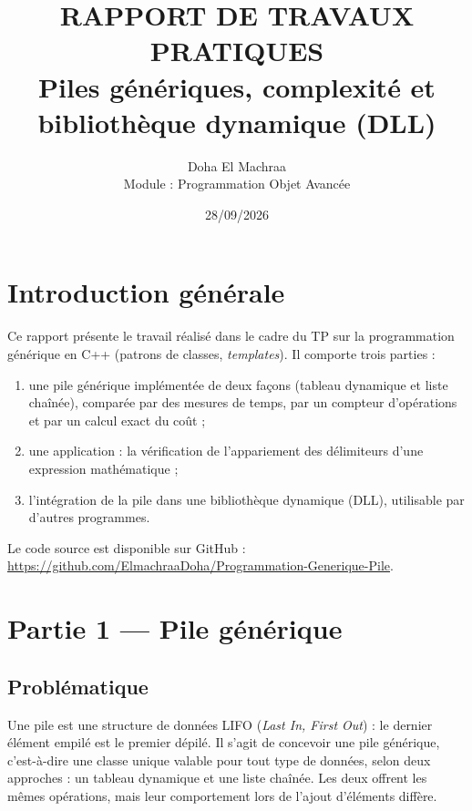 \documentclass[11pt,a4paper]{article}
\title{
\textbf{RAPPORT DE TRAVAUX PRATIQUES}\\[4pt]
\large Piles génériques, complexité et bibliothèque dynamique (DLL)
}
\author{Doha El Machraa\\ Module : Programmation Objet Avancée}
\date{28/09/2026}
\begin{document}
\maketitle
\tableofcontents
\bigskip

\section{Introduction générale}

Ce rapport présente le travail réalisé dans le cadre du TP sur la programmation générique en C++ (patrons de classes, \emph{templates}). Il comporte trois parties :
\begin{enumerate}[nosep]
    \item une pile générique implémentée de deux façons (tableau dynamique et liste chaînée), comparée par des mesures de temps, par un compteur d'opérations et par un calcul exact du coût ;
    \item une application : la vérification de l'appariement des délimiteurs d'une expression mathématique ;
    \item l'intégration de la pile dans une bibliothèque dynamique (DLL), utilisable par d'autres programmes.
\end{enumerate}

Le code source est disponible sur GitHub : \url{https://github.com/ElmachraaDoha/Programmation-Generique-Pile}.

\section{Partie 1 --- Pile générique}

\subsection{Problématique}

Une pile est une structure de données LIFO (\emph{Last In, First Out}) : le dernier élément empilé est le premier dépilé. Il s'agit de concevoir une pile générique, c'est-à-dire une classe unique valable pour tout type de données, selon deux approches : un tableau dynamique et une liste chaînée. Les deux offrent les mêmes opérations, mais leur comportement lors de l'ajout d'éléments diffère.
\end{document}
